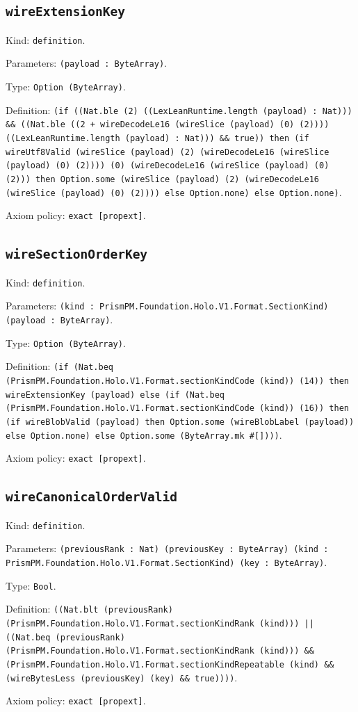\documentclass[11pt]{article}
\begin{document}
\subsection*{\texttt{wireExtensionKey}}
\noindent Kind: \texttt{definition}.\par
\noindent Parameters: \texttt{(payload : ByteArray)}.\par
\noindent Type: \texttt{Option (ByteArray)}.\par
\noindent Definition: \texttt{(if ((Nat.ble (2) ((LexLeanRuntime.length (payload) : Nat))) \&\& ((Nat.ble ((2 + wireDecodeLe16 (wireSlice (payload) (0) (2)))) ((LexLeanRuntime.length (payload) : Nat))) \&\& true)) then (if wireUtf8Valid (wireSlice (payload) (2) (wireDecodeLe16 (wireSlice (payload) (0) (2)))) (0) (wireDecodeLe16 (wireSlice (payload) (0) (2))) then Option.some (wireSlice (payload) (2) (wireDecodeLe16 (wireSlice (payload) (0) (2)))) else Option.none) else Option.none)}.\par
\noindent Axiom policy: \texttt{exact [propext]}.\par
\subsection*{\texttt{wireSectionOrderKey}}
\noindent Kind: \texttt{definition}.\par
\noindent Parameters: \texttt{(kind : PrismPM.Foundation.Holo.V1.Format.SectionKind) (payload : ByteArray)}.\par
\noindent Type: \texttt{Option (ByteArray)}.\par
\noindent Definition: \texttt{(if (Nat.beq (PrismPM.Foundation.Holo.V1.Format.sectionKindCode (kind)) (14)) then wireExtensionKey (payload) else (if (Nat.beq (PrismPM.Foundation.Holo.V1.Format.sectionKindCode (kind)) (16)) then (if wireBlobValid (payload) then Option.some (wireBlobLabel (payload)) else Option.none) else Option.some (ByteArray.mk \#[])))}.\par
\noindent Axiom policy: \texttt{exact [propext]}.\par
\subsection*{\texttt{wireCanonicalOrderValid}}
\noindent Kind: \texttt{definition}.\par
\noindent Parameters: \texttt{(previousRank : Nat) (previousKey : ByteArray) (kind : PrismPM.Foundation.Holo.V1.Format.SectionKind) (key : ByteArray)}.\par
\noindent Type: \texttt{Bool}.\par
\noindent Definition: \texttt{((Nat.blt (previousRank) (PrismPM.Foundation.Holo.V1.Format.sectionKindRank (kind))) || ((Nat.beq (previousRank) (PrismPM.Foundation.Holo.V1.Format.sectionKindRank (kind))) \&\& (PrismPM.Foundation.Holo.V1.Format.sectionKindRepeatable (kind) \&\& (wireBytesLess (previousKey) (key) \&\& true))))}.\par
\noindent Axiom policy: \texttt{exact [propext]}.\par
\end{document}
